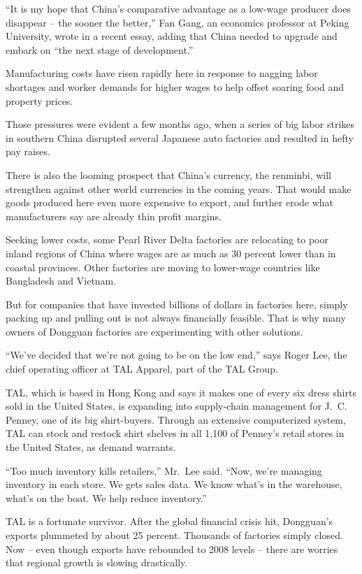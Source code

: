 ﻿\documentclass[12pt]{article}
\begin{document}
``It is my hope that China's comparative advantage as a low-wage producer does disappear -- the
sooner the better,'' Fan Gang, an economics professor at Peking University, wrote in a recent essay,
adding that China needed to upgrade and embark on ``the next stage of development.''

Manufacturing costs have risen rapidly here in response to nagging labor shortages and worker
demands for higher wages to help offset soaring food and property prices.

Those pressures were evident a few months ago, when a series of big labor strikes in southern China
disrupted several Japanese auto factories and resulted in hefty pay raises.

There is also the looming prospect that China's currency, the renminbi, will strengthen against
other world currencies in the coming years. That would make goods produced here even more expensive
to export, and further erode what manufacturers say are already thin profit margins.

Seeking lower costs, some Pearl River Delta factories are relocating to poor inland regions of China
where wages are as much as 30 percent lower than in coastal provinces. Other factories are moving to
lower-wage countries like Bangladesh and Vietnam.

But for companies that have invested billions of dollars in factories here, simply packing up and
pulling out is not always financially feasible. That is why many owners of Dongguan factories are
experimenting with other solutions.

``We've decided that we're not going to be on the low end,'' says Roger Lee, the chief operating
officer at TAL Apparel, part of the TAL Group.

TAL, which is based in Hong Kong and says it makes one of every six dress shirts sold in the United
States, is expanding into supply-chain management for J.~C. Penney, one of its big shirt-buyers.
Through an extensive computerized system, TAL can stock and restock shirt shelves in all 1,100 of
Penney's retail stores in the United States, as demand warrants.

``Too much inventory kills retailers,'' Mr.~Lee said. ``Now, we're managing inventory in each store.
We gets sales data. We know what's in the warehouse, what's on the boat. We help reduce inventory.''

TAL is a fortunate survivor. After the global financial crisis hit, Dongguan's exports plummeted by
about 25 percent. Thousands of factories simply closed. Now -- even though exports have rebounded to
2008 levels -- there are worries that regional growth is slowing drastically.
\end{document}
